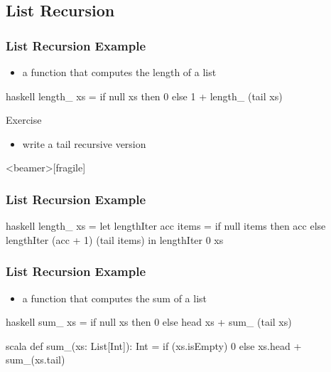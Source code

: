 \documentclass[dvipsnames]{beamer}
\theoremstyle{plain}
\begin{document}
\subsection{List Recursion}

\begin{frame}[fragile]
  \frametitle{List Recursion Example}

  \begin{example}
    \begin{itemize}
      \item a function that computes the length of a list
    \end{itemize}
    
    \begin{pygments}{haskell}
length_ xs =
    if null xs
    then 0
    else 1 + length_ (tail xs)
    \end{pygments}
  \end{example}

  \pause
  \begin{block}{Exercise}
    \begin{itemize}
      \item write a tail recursive version
    \end{itemize}
  \end{block}
\end{frame}

\begin{frame}<beamer>[fragile]
  \frametitle{List Recursion Example}

  \begin{example}
    \begin{pygments}{haskell}
length_ xs =
    let
        lengthIter acc items =
            if null items
            then acc
            else lengthIter (acc + 1) (tail items)
    in
        lengthIter 0 xs
    \end{pygments}
  \end{example}
\end{frame}

\begin{frame}[fragile]
  \frametitle{List Recursion Example}
  \begin{example}
    \begin{itemize}
      \item a function that computes the sum of a list
    \end{itemize}

    \pause
    \begin{pygments}{haskell}
sum_ xs =
    if null xs
    then 0
    else head xs + sum_ (tail xs)
    \end{pygments}
  \end{example}

  \pause
  \begin{example}[Scala]
    \begin{pygments}{scala}
def sum_(xs: List[Int]): Int =
    if (xs.isEmpty) 0
    else xs.head + sum_(xs.tail)
    \end{pygments}
  \end{example}
\end{frame}
\end{document}
